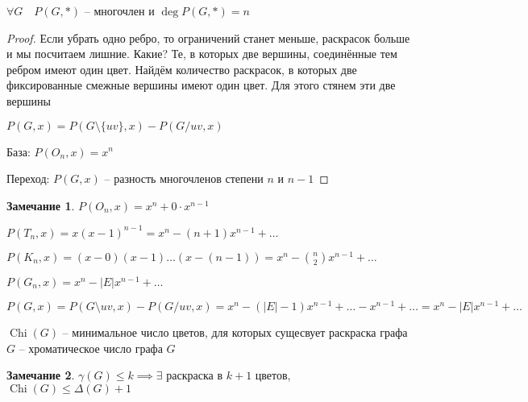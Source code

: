 \documentclass{book}
\theoremstyle{definition}
\newtheorem*{note}{Замечание}
\DeclareMathOperator{\Chi}{Chi}
\begin{document}
\begin{statement}
    $\forall G\quad P(G, *)$ -- многочлен и $\deg P(G, *) = n$
\end{statement}
\begin{proof}
    Если убрать одно ребро, то ограничений станет меньше, раскрасок больше и мы посчитаем лишние. Какие? Те, в которых две вершины, соединённые тем ребром имеют один цвет. Найдём количество раскрасок, в которых две фиксированные смежные вершины имеют один цвет. Для этого стянем эти две вершины

    $P(G, x) = P\left( G\setminus \{uv\}, x \right) - P\left( G / uv,x \right)  $ 

    База: $P(O_n, x) = x^n$

    Переход:  $P(G,x)$ -- разность многочленов степени  $n$ и  $n-1$
\end{proof}

\begin{note}
    $P(O_n, x) = x^n + 0\cdot x^{n-1}$

    $P(T_n,x) = x(x-1)^{n-1} = x^n - (n+1)x^{n-1} + \ldots$

    $P(K_n, x) = (x-0)(x-1)\ldots(x-(n-1)) = x^n - \binom n 2 x^{n-1} + \ldots$

    $P(G_n, x) = x^n - |E|x^{n-1} + \ldots$

    $P(G, x) = P\left( G\setminus uv, x \right)  - P\left( G / uv, x \right)  = x^n - (|E|-1)x^{n-1} + \ldots - x^{n-1} + \ldots = x^n - |E|x^{n-1} + \ldots$
\end{note}

\begin{definition}
    $\Chi(G)$ -- минимальное число цветов, для которых сущесвует раскраска графа  $G$ -- хроматическое число графа  $G$
\end{definition}

\begin{note}
    $\gamma(G)\leqslant k \implies \exists $ раскраска в $k+1$ цветов,  $\Chi(G)\leqslant \Delta(G) + 1$
\end{note}
\end{document}
